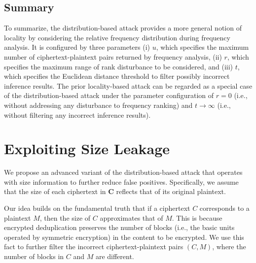\subsection{Summary} To summarize, the distribution-based attack provides a
more general notion of locality by considering the relative frequency
distribution during frequency analysis.  It is configured by three parameters
(i) $u$, which specifies the maximum number of ciphertext-plaintext pairs returned by frequency analysis, 
(ii) $r$, which specifies the maximum range of rank disturbance to be
considered, and (iii) $t$, which specifies the Euclidean distance threshold to
filter possibly incorrect inference results. 
The prior locality-based attack \cite{li17} can be regarded as a special case
of the distribution-based attack under the parameter configuration of $r = 0$
(i.e., without addressing any disturbance to frequency ranking) and 
$t\rightarrow\infty$ (i.e., without filtering any incorrect inference results).     
 
 
 



\section{Exploiting Size Leakage}

We propose an advanced variant of the distribution-based attack that operates with size information to further reduce false positives. Specifically, we assume that the size of each ciphertext in $\mathbf{C}$ reflects that of its original plaintext.   



Our idea builds on the fundamental truth that if a ciphertext $C$ corresponds to a plaintext $M$, then the size of $C$ approximates that of $M$. This is because encrypted deduplication preserves the number of blocks (i.e., the basic units operated by symmetric encryption) in the content to be encrypted. We use this fact to further filter the incorrect ciphertext-plaintext pairs $(C, M)$, where the number of blocks in $C$ and $M$ are different.  

